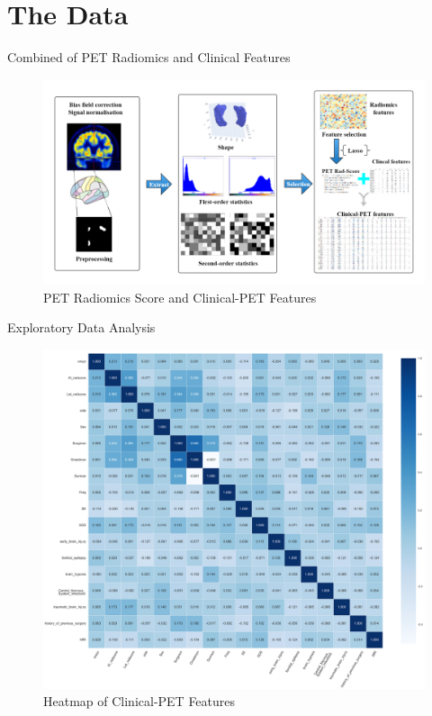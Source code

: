 \documentclass[
  11pt,
  ignorenonframetext,
  fontset=fandol]{beamer}
\begin{document}
\hypertarget{the-data}{%
\section{The Data}\label{the-data}}

\begin{frame}{Combined of PET Radiomics and Clinical Features}
\protect\hypertarget{combined-of-pet-radiomics-and-clinical-features}{}
\begin{figure}

{\centering \includegraphics[width=1.1\linewidth]{images/PET_radiomics} 

}

\caption{PET Radiomics  Score and Clinical-PET Features}\label{fig:unnamed-chunk-5}
\end{figure}
\end{frame}

\begin{frame}{Exploratory Data Analysis}
\protect\hypertarget{exploratory-data-analysis}{}
\begin{figure}

{\centering \includegraphics[width=0.6\linewidth]{images/heatplot} 

}

\caption{Heatmap of Clinical-PET Features}\label{fig:unnamed-chunk-6}
\end{figure}
\end{frame}
\end{document}

